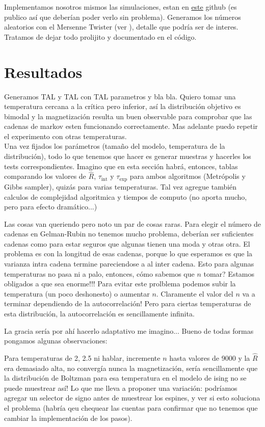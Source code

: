 \documentclass[a4paper, 12pt]{article}
\newcommand{\tauint}{\tau_\text{int}}
\newcommand{\tauexp}{\tau_\text{exp}}
\begin{document}
Implementamos nosotros mismos las simulaciones, estan en \href{https://github.com/santigiordani/fiscomp-final.git}{este} github (es publico así que deberían poder verlo sin problema). Generamos los números aleatorios con el Mersenne Twister (ver \cite{matsumoto1998mersenne}), detalle que podría ser de interes. Tratamos de dejar todo prolijito y documentado en el código.

\section{Resultados}

Generamos TAL y TAL con TAL parametros y bla bla. Quiero tomar una temperatura cercana a la crítica pero inferior, así la distribución objetivo es bimodal y la magnetización resulta un buen observable para comprobar que las cadenas de markov esten funcionando correctamente. Mas adelante puedo repetir el experimento con otras temperaturas.\\

Una vez fijados los parámetros (tamaño del modelo, temperatura de la distribución), todo lo que tenemos que hacer es generar muestras y hacerles los tests correspondientes. Imagino que en esta sección habrá, entonces, tablas comparando los valores de $\hat{R}$, $\tauint$ y $\tauexp$ para ambos algoritmos (Metrópolis y Gibbs sampler), quizás para varias temperaturas. Tal vez agregue también calculos de complejidad algoritmica y tiempos de computo (no aporta mucho, pero para efecto dramático...)

Las cosas van queriendo pero noto un par de cosas raras. Para elegir el número de cadenas en Gelman-Rubin no tenemos mucho problema, deberían ser suficientes cadenas como para estar seguros que algunas tienen una moda y otras otra. El problema es con la longitud de esas cadenas, porque lo que esperamos es que la varianza intra cadena termine pareciendose a al inter cadena. Esto para algunas temperaturas no pasa ni a palo, entonces, cómo sabemos que $n$ tomar? Estamos obligados a que sea enorme!!! Para evitar este prolblema podemos subir la temperatura (un poco deshonesto) o aumentar $n$. Claramente el valor del $n$ va a terminar dependiendo de la autocorrelación! Pero para ciertas temperaturas de esta distribución, la autocorrelación es sencillamente infinita.

La gracia sería por ahí hacerlo adaptativo me imagino... Bueno de todas formas pongamos algunas observaciones:

Para temperaturas de 2, 2.5 ni hablar, incremente $n$ hasta valores de 9000 y la $\hat{R}$ era demasiado alta, no convergía nunca la magnetización, sería sencillamente que la distribución de Boltzman para esa temperatura en el modelo de ising no se puede muestrear así! Lo que me lleva a proponer una variación: podríamos agregar un selector de signo antes de muestrear los espines, y ver si esto soluciona el problema (habría qeu chequear las cuentas para confirmar que no tenemos que cambiar la implementación de los pasos).
\end{document}
